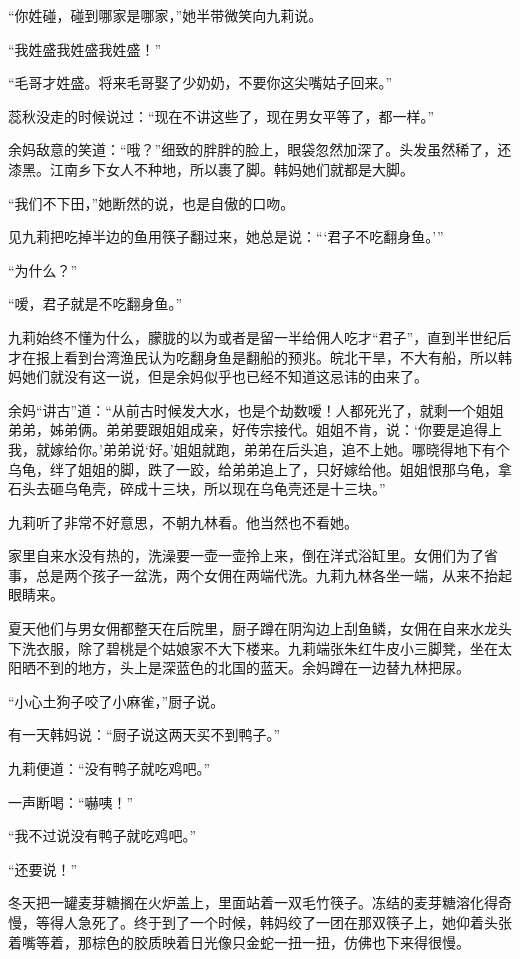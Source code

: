 \par “你姓碰，碰到哪家是哪家，”她半带微笑向九莉说。
\par “我姓盛我姓盛我姓盛！”
\par “毛哥才姓盛。将来毛哥娶了少奶奶，不要你这尖嘴姑子回来。”
\par 蕊秋没走的时候说过：“现在不讲这些了，现在男女平等了，都一样。”
\par 余妈敌意的笑道：“哦？”细致的胖胖的脸上，眼袋忽然加深了。头发虽然稀了，还漆黑。江南乡下女人不种地，所以裹了脚。韩妈她们就都是大脚。
\par “我们不下田，”她断然的说，也是自傲的口吻。
\par 见九莉把吃掉半边的鱼用筷子翻过来，她总是说：“‘君子不吃翻身鱼。'”
\par “为什么？”
\par “嗳，君子就是不吃翻身鱼。”
\par 九莉始终不懂为什么，朦胧的以为或者是留一半给佣人吃才“君子”，直到半世纪后才在报上看到台湾渔民认为吃翻身鱼是翻船的预兆。皖北干旱，不大有船，所以韩妈她们就没有这一说，但是余妈似乎也已经不知道这忌讳的由来了。
\par 余妈“讲古”道：“从前古时候发大水，也是个劫数嗳！人都死光了，就剩一个姐姐弟弟，姊弟俩。弟弟要跟姐姐成亲，好传宗接代。姐姐不肯，说：‘你要是追得上我，就嫁给你。’弟弟说‘好。’姐姐就跑，弟弟在后头追，追不上她。哪晓得地下有个乌龟，绊了姐姐的脚，跌了一跤，给弟弟追上了，只好嫁给他。姐姐恨那乌龟，拿石头去砸乌龟壳，碎成十三块，所以现在乌龟壳还是十三块。”
\par 九莉听了非常不好意思，不朝九林看。他当然也不看她。
\par 家里自来水没有热的，洗澡要一壶一壶拎上来，倒在洋式浴缸里。女佣们为了省事，总是两个孩子一盆洗，两个女佣在两端代洗。九莉九林各坐一端，从来不抬起眼睛来。
\par 夏天他们与男女佣都整天在后院里，厨子蹲在阴沟边上刮鱼鳞，女佣在自来水龙头下洗衣服，除了碧桃是个姑娘家不大下楼来。九莉端张朱红牛皮小三脚凳，坐在太阳晒不到的地方，头上是深蓝色的北国的蓝天。余妈蹲在一边替九林把尿。
\par “小心土狗子咬了小麻雀，”厨子说。
\par 有一天韩妈说：“厨子说这两天买不到鸭子。”
\par 九莉便道：“没有鸭子就吃鸡吧。”
\par 一声断喝：“嚇咦！”
\par “我不过说没有鸭子就吃鸡吧。”
\par “还要说！”
\par 冬天把一罐麦芽糖搁在火炉盖上，里面站着一双毛竹筷子。冻结的麦芽糖溶化得奇慢，等得人急死了。终于到了一个时候，韩妈绞了一团在那双筷子上，她仰着头张着嘴等着，那棕色的胶质映着日光像只金蛇一扭一扭，仿佛也下来得很慢。
